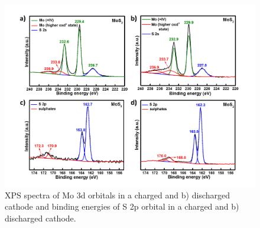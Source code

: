 \begin{figure}
  \centering
  \includegraphics[width=\textwidth]{Figures/chap4fig/MoS2XPS}
  \caption{XPS spectra of Mo 3d orbitals in a charged and b) discharged  cathode and binding energies of S 2p orbital in a charged and b) discharged  cathode.}
  \label{Figures/chap4fig:MoS2XPS}
\end{figure}

